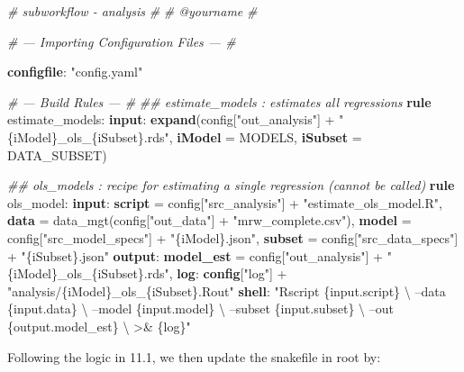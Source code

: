 \documentclass[]{book}
\newenvironment{Shaded}{\begin{snugshade}}{\end{snugshade}}
\newcommand{\KeywordTok}[1]{\textcolor[rgb]{0.13,0.29,0.53}{\textbf{{#1}}}}
\newcommand{\StringTok}[1]{\textcolor[rgb]{0.31,0.60,0.02}{{#1}}}
\newcommand{\CommentTok}[1]{\textcolor[rgb]{0.56,0.35,0.01}{\textit{{#1}}}}
\newcommand{\NormalTok}[1]{{#1}}
\theoremstyle{definition}
\theoremstyle{definition}
\theoremstyle{definition}
\theoremstyle{remark}
\begin{document}
\begin{Shaded}
\begin{Highlighting}[]
\CommentTok{# subworkflow - analysis}
\CommentTok{#}
\CommentTok{# @yourname}
\CommentTok{#}

\CommentTok{# --- Importing Configuration Files --- #}

\KeywordTok{configfile}\NormalTok{: }\StringTok{"config.yaml"}

\CommentTok{# --- Build Rules --- #}
\CommentTok{## estimate_models    : estimates all regressions}
\KeywordTok{rule} \NormalTok{estimate_models:}
    \KeywordTok{input}\NormalTok{:}
        \KeywordTok{expand}\NormalTok{(config[}\StringTok{"out_analysis"}\NormalTok{] + }\StringTok{"\{iModel\}_ols_\{iSubset\}.rds"}\NormalTok{,}
                    \KeywordTok{iModel} \NormalTok{= MODELS,}
                    \KeywordTok{iSubset} \NormalTok{= DATA_SUBSET)}

\CommentTok{## ols_models         : recipe for estimating a single regression (cannot be called)}
\KeywordTok{rule} \NormalTok{ols_model:}
    \KeywordTok{input}\NormalTok{:}
        \KeywordTok{script} \NormalTok{= config[}\StringTok{"src_analysis"}\NormalTok{] + }\StringTok{"estimate_ols_model.R"}\NormalTok{,}
        \KeywordTok{data}   \NormalTok{= data_mgt(config[}\StringTok{"out_data"}\NormalTok{] + }\StringTok{"mrw_complete.csv"}\NormalTok{),}
        \KeywordTok{model}  \NormalTok{= config[}\StringTok{"src_model_specs"}\NormalTok{] + }\StringTok{"\{iModel\}.json"}\NormalTok{,}
        \KeywordTok{subset} \NormalTok{= config[}\StringTok{"src_data_specs"}\NormalTok{]  + }\StringTok{"\{iSubset\}.json"}
    \KeywordTok{output}\NormalTok{:}
        \KeywordTok{model_est} \NormalTok{= config[}\StringTok{"out_analysis"}\NormalTok{] + }\StringTok{"\{iModel\}_ols_\{iSubset\}.rds"}\NormalTok{,}
    \KeywordTok{log}\NormalTok{:}
        \KeywordTok{config}\NormalTok{[}\StringTok{"log"}\NormalTok{] + }\StringTok{"analysis/\{iModel\}_ols_\{iSubset\}.Rout"}
    \KeywordTok{shell}\NormalTok{:}
        \StringTok{"Rscript \{input.script\} \textbackslash{}}
\StringTok{            --data \{input.data\} \textbackslash{}}
\StringTok{            --model \{input.model\} \textbackslash{}}
\StringTok{            --subset \{input.subset\} \textbackslash{}}
\StringTok{            --out \{output.model_est\} \textbackslash{}}
\StringTok{            >& \{log\}"}
\end{Highlighting}
\end{Shaded}

Following the logic in 11.1, we then update the snakefile in root by:
\end{document}
